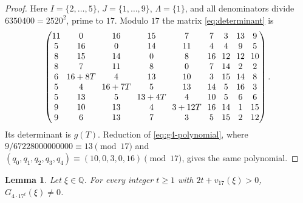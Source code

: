 \documentclass{amsart}
\newtheorem{lemma}{Lemma}[section]
\numberwithin{equation}{section}
\numberwithin{table}{section}
\begin{document}
\begin{proof}
Here $I=\{2,\ldots,5\}$, $J=\{1,\ldots,9\}$, $\Lambda=\{1\}$, and all
denominators divide $6350400=2520^2$, prime to $17$. Modulo $17$ the matrix
\eqref{eq:determinant} is
\begin{equation}\label{eq:g4-mod-matrix}
\setlength{\arraycolsep}{3.5pt}
\begin{pmatrix}
11&0&16&15&7&7&3&13&9\\
5&16&0&14&11&4&4&9&5\\
8&15&14&0&8&16&12&12&10\\
8&7&11&8&0&7&14&2&2\\
6&16+8T&4&13&10&3&15&14&8\\
5&4&16+7T&5&13&14&5&16&3\\
5&13&5&13+4T&4&10&5&6&6\\
9&10&13&4&3+12T&16&14&1&15\\
9&6&13&7&3&5&15&2&12
\end{pmatrix}.
\end{equation}
Its determinant is $g(T)$. Reduction of \eqref{eq:g4-polynomial}, where
$9/67228000000000\equiv13\pmod{17}$ and
$(q_0,q_1,q_2,q_3,q_4)\equiv(10,0,3,0,16)\pmod{17}$, gives the same
polynomial.
\end{proof}

\begin{lemma}\label{lem:nonvanishing}
Let $\xi\in\mathbb Q$. For every integer $t\ge1$ with $2t+v_{17}(\xi)>0$,
$G_{4\cdot17^t}(\xi)\ne0$.
\end{lemma}
\end{document}
